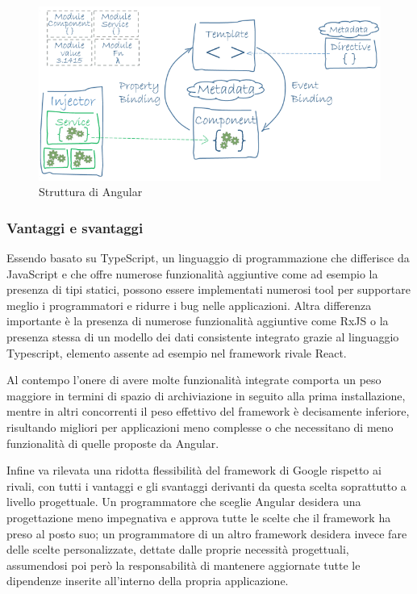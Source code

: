 \begin{figure}[H]
\centering
\includegraphics[scale=0.5]{res/angular.png}
\caption{Struttura di Angular}
\label{fig:angular}
\end{figure}

\subsubsection{Vantaggi e svantaggi}

Essendo basato su TypeScript, un linguaggio di programmazione che differisce da JavaScript e che offre numerose funzionalità aggiuntive come ad esempio la presenza di tipi statici, possono essere implementati numerosi tool per supportare meglio i programmatori e ridurre i bug nelle applicazioni.
Altra differenza importante è la presenza di numerose funzionalità aggiuntive come RxJS o la presenza stessa di un modello dei dati consistente integrato grazie al linguaggio Typescript, elemento assente ad esempio nel framework rivale React.

Al contempo l’onere di avere molte funzionalità integrate comporta un peso maggiore in termini di spazio di archiviazione in seguito alla prima installazione, mentre in altri concorrenti il peso effettivo del framework è decisamente inferiore, risultando
migliori per applicazioni meno complesse o che necessitano di meno funzionalità di quelle proposte da Angular.

Infine va rilevata una ridotta flessibilità del framework di Google rispetto ai rivali, con tutti i vantaggi e gli svantaggi derivanti da questa scelta soprattutto a livello progettuale. Un programmatore che sceglie Angular desidera una progettazione meno
impegnativa e approva tutte le scelte che il framework ha preso al posto suo; un programmatore di un altro framework desidera invece fare delle scelte personalizzate, dettate dalle proprie necessità progettuali, assumendosi poi però la responsabilità di mantenere aggiornate tutte le dipendenze inserite all’interno della propria applicazione.

